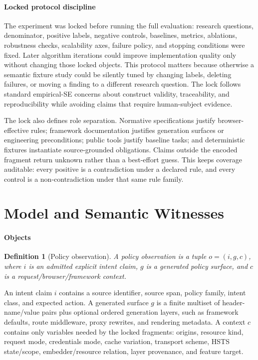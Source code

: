 \documentclass[10pt,conference]{IEEEtran}
\newtheorem{definition}{Definition}
\begin{document}
\paragraph{Locked protocol discipline}

The experiment was locked before running the full evaluation: research questions, denominator, positive labels, negative controls, baselines, metrics, ablations, robustness checks, scalability axes, failure policy, and stopping conditions were fixed. Later algorithm iterations could improve implementation quality only without changing those locked objects. This protocol matters because otherwise a semantic fixture study could be silently tuned by changing labels, deleting failures, or moving a finding to a different research question. The lock follows standard empirical-SE concerns about construct validity, traceability, and reproducibility \cite{seaman_qualitative_1999,stol_grounded_theory_2016,nasem_reproducibility_2019} while avoiding claims that require human-subject evidence.


The lock also defines role separation. Normative specifications justify browser-effective rules; framework documentation justifies generation surfaces or engineering preconditions; public tools justify baseline tasks; and deterministic fixtures instantiate source-grounded obligations.  Claims outside the encoded fragment return unknown rather than a best-effort guess.  This keeps coverage auditable: every positive is a contradiction under a declared rule, and every control is a non-contradiction under that same rule family.

\section{Model and Semantic Witnesses}

\paragraph{Objects}

\begin{definition}[Policy observation]
A policy observation is a tuple $o=(i,g,c)$, where $i$ is an admitted explicit intent claim, $g$ is a generated policy surface, and $c$ is a request/browser/framework context.
\end{definition}

An intent claim $i$ contains a source identifier, source span, policy family, intent class, and expected action. A generated surface $g$ is a finite multiset of header-name/value pairs plus optional ordered generation layers, such as framework defaults, route middleware, proxy rewrites, and rendering metadata. A context $c$ contains only variables needed by the locked fragments: origins, resource kind, request mode, credentials mode, cache variation, transport scheme, HSTS state/scope, embedder/resource relation, layer provenance, and feature target.
\end{document}
